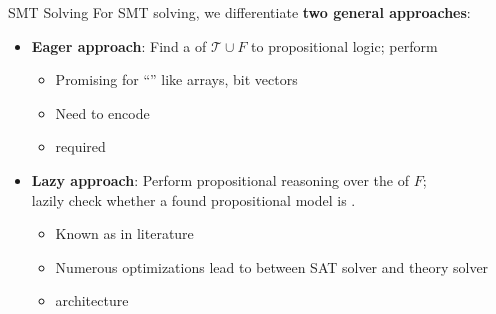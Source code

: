 \documentclass[t,english]{sdqbeamer}
\begin{document}
\begin{frame}{SMT Solving}
	For SMT solving, we differentiate \textbf{two general approaches}:\\[4mm]
	\pause
	
	\begin{itemize}
		\item \textbf{Eager approach}: Find a  of $\mathcal{T} \cup F$ to propositional logic; perform ~\cite{brummayer2009boolector}
		\begin{itemize}
			\item Promising for ``'' like arrays, bit vectors
			\item Need to encode 
			\item {} required
		\end{itemize}
		\pause
		\vspace*{2mm}
		\item \textbf{Lazy approach}: Perform propositional reasoning over the  of $F$;\\
		lazily check whether a found propositional model is .
		\begin{itemize}
			\item Known as  in literature~\cite{nieuwenhuis2006solving}
			\item Numerous optimizations lead to  between SAT solver and theory solver
			\item {} architecture
		\end{itemize}
	\end{itemize}
\end{frame}


\newcommand{\propA}[1]{\textcolor{colA}{#1}}
\newcommand{\propB}[1]{\textcolor{colB}{#1}}
\newcommand{\propC}[1]{\textcolor{colC}{#1}}
\newcommand{\propD}[1]{\textcolor{colD}{#1}}
\newcommand{\propE}[1]{\textcolor{colE}{#1}}
\end{document}
